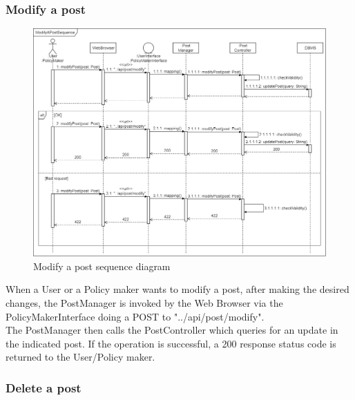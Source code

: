 \newpage
\subsubsection{Modify a post}

\begin{figure}[h!]
        \centering
        \includegraphics[scale=0.30]{images/runtime_view/modify_post_runtime_view_diagram.png}
        \caption{Modify a post sequence diagram}
        \label{fig:modify_a_post_sequence_diagram}
\end{figure}
\FloatBarrier

When a User or a Policy maker wants to modify a post, after making the desired changes, the PostManager is invoked by the Web Browser via the PolicyMakerInterface doing a POST to "../api/post/modify". \\
The PostManager then calls the PostController which queries for an update in the indicated post. If the operation is successful, a 200 response status code is returned to the User/Policy maker.

\newpage
\subsubsection{Delete a post}

